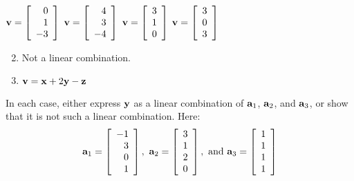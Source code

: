 \begin{multicols}{2}
\begin{ex}
\begin{exenumerate}
\exitem 
$\textbf{v} = 
\left[ \begin{array}{r}
	0 \\
	1 \\
	-3	
\end{array} \right]$
\exitem 
$\textbf{v} = 
\left[ \begin{array}{r}
	4 \\
	3 \\
	-4
\end{array} \right]$
\exitem 
$\textbf{v} = 
\left[ \begin{array}{r}
	3 \\
	1 \\
	0
\end{array} \right]$
\exitem 
$\textbf{v} = 
\left[ \begin{array}{r}
	3 \\
	0 \\
	3
\end{array} \right]$
\end{exenumerate}
\begin{sol}
\begin{enumerate}[label={\alph*.}]
\setcounter{enumi}{1}
\item  Not a linear combination.

\setcounter{enumi}{3}
\item  $\textbf{v} = \textbf{x} + 2\textbf{y} - \textbf{z}$

\end{enumerate}
\end{sol}
\end{ex}

\begin{ex}
In each case, either express $\textbf{y}$ as a linear combination of $\textbf{a}_1$, $\textbf{a}_2$, and $\textbf{a}_3$, or show that it is not such a linear combination. Here:
\begin{equation*}
\textbf{a}_1 =
\left[ \begin{array}{r}
	-1 \\
	3 \\
	0 \\
	1
\end{array} \right], \
\textbf{a}_2 =
\left[ \begin{array}{r}
	3 \\
	1 \\
	2 \\
	0
\end{array} \right],
\mbox{ and } \textbf{a}_3 =
\left[ \begin{array}{r}
	1 \\
	1 \\
	1 \\
	1
\end{array} \right]
\end{equation*}


\end{ex}
\end{multicols}
